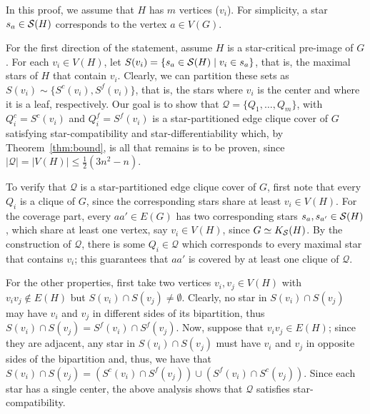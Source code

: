 \begin{tproof}
    In this proof, we assume that $H$ has $m$ vertices ($v_i$). For simplicity, a star $s_a \in \mathcal{S}(H)$ corresponds to the vertex $a \in V(G)$.
    
    For the first direction of the statement, assume $H$ is a star-critical pre-image of $G$.
    For each $v_i \in V(H)$, let $S(v_i) = \{s_a \in \mathcal{S}(H) \mid v_i \in s_a\}$, that is, the maximal stars of $H$ that contain $v_i$.
    Clearly, we can partition these sets as $S(v_i) \sim \{S^c(v_i), S^f(v_i)\}$, that is, the stars where $v_i$ is the center and where it is a leaf, respectively.
    Our goal is to show that $\mathcal{Q} = \{Q_1, \dots, Q_m\}$, with $Q_i^c = S^c(v_i)$ and $Q_i^f = S^f(v_i)$ is a star-partitioned edge clique cover of $G$ satisfying star-compatibility and star-differentiability which, by Theorem~\ref{thm:bound}, is all that remains is to be proven, since $|\mathcal{Q}| = |V(H)| \leq \frac{1}{2}(3n^2 - n)$.
    
    To verify that $\mathcal{Q}$ is a star-partitioned edge clique cover of $G$, first note that every $Q_i$ is a clique of $G$, since the corresponding stars share at least $v_i \in V(H)$.
    For the coverage part, every $aa' \in E(G)$ has two corresponding stars $s_a, s_{a'} \in \mathcal{S}(H)$, which share at least one vertex, say $v_i \in V(H)$, since $G \simeq K_{\mathcal{S}}(H)$.
    By the construction of $\mathcal{Q}$, there is some $Q_i \in \mathcal{Q}$ which corresponds to every maximal star that contains $v_i$; this guarantees that $aa'$ is covered by at least one clique of $\mathcal{Q}$.
    
    For the other properties, first take two vertices $v_i,v_j \in V(H)$ with $v_iv_j \notin E(H)$ but $S(v_i) \cap S(v_j) \neq \emptyset$.
    Clearly, no star in $S(v_i) \cap S(v_j)$ may have $v_i$ and $v_j$ in different sides of its bipartition, thus $S(v_i) \cap S(v_j) = S^f(v_i) \cap S^f(v_j)$.
    Now, suppose that $v_iv_j \in E(H)$; since they are adjacent, any star in $S(v_i) \cap S(v_j)$ must have $v_i$ and $v_j$ in opposite sides of the bipartition and, thus, we have that $S(v_i) \cap S(v_j) = \left(S^c(v_i) \cap S^f(v_j)\right) \cup \left(S^f(v_i) \cap S^c(v_j)\right)$.
    Since each star has a single center, the above analysis shows that $\mathcal{Q}$ satisfies star-compatibility.
    

\end{tproof}
